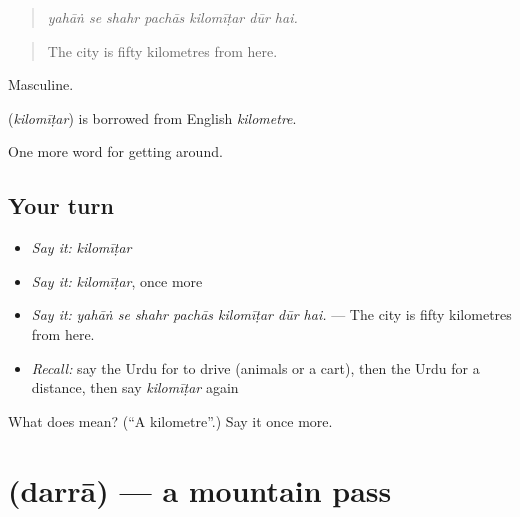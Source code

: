 \begin{quote}
      
\end{quote}

\begin{quote}
\emph{yahāṅ se shahr pachās kilomīṭar dūr hai.}
\end{quote}

\begin{quote}
The city is fifty kilometres from here.
\end{quote}

Masculine.

\begin{cousinweb}
\textbf{} (\emph{kilomīṭar}) is borrowed from English \emph{kilometre}.
\end{cousinweb}

\begin{grammarlens}[title={What you've built}]
One more word for getting around.
\end{grammarlens}

\subsection*{Your turn}
\begin{itemize}
\raggedright
  \item \emph{Say it:} \emph{kilomīṭar}
  \item \emph{Say it:} \emph{kilomīṭar}, once more
  \item \emph{Say it:} \emph{yahāṅ se shahr pachās kilomīṭar dūr hai.} — The city is fifty kilometres from here.
  \item \emph{Recall:} say the Urdu for to drive (animals or a cart), then the Urdu for a distance, then say \emph{kilomīṭar} again
\end{itemize}

\begin{tcolorbox}[breakable,colback=teal!4,colframe=teal!35!black,title={Before you move on}]
What does  mean? (\textquotedblleft{}A kilometre\textquotedblright{}.) Say it once more.
\end{tcolorbox}
\section[\texorpdfstring{\ur{درہ} (darrā)}{درہ (darrā)}]{ (darrā) — a mountain pass}

\label{lesson:UR-C397-darra}



